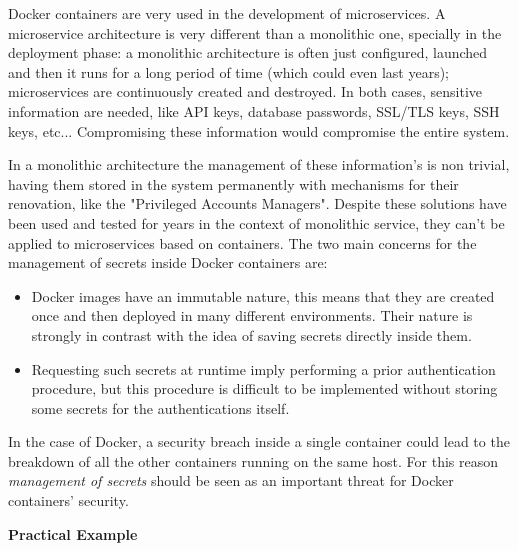 \documentclass[a4paper,12pt]{article}
\begin{document}
Docker containers are very used in the development of microservices. A
microservice architecture is very different than a monolithic one, specially in
the deployment phase: a monolithic architecture is often just configured,
launched and then it runs for a long period of time (which could even last
years); microservices are continuously created and destroyed. In both cases,
sensitive information are needed, like API keys, database passwords, SSL/TLS
keys, SSH keys, etc... Compromising these information would compromise the
entire system. \par In a monolithic architecture the management of these
information's is non trivial, having them stored in the system permanently with
mechanisms for their renovation, like the "Privileged Accounts
Managers"\cite{privileged_accounts_managers}. Despite these solutions have been
used and tested for years in the context of monolithic service, they can't be
applied to microservices based on containers. The two main concerns for the
management of secrets inside Docker containers
are\cite{secret_management_concerns_docker}:
\begin{itemize}
  \item Docker images have an immutable nature, this means that they are created
  once and then deployed in many different environments. Their nature is
  strongly in contrast with the idea of saving secrets directly inside them.  
  \item Requesting such secrets at runtime imply performing a prior
  authentication procedure, but this procedure is difficult to be implemented
  without storing some secrets for the authentications itself.
\end{itemize}
\par In the case of Docker, a security breach inside a single container could
lead to the breakdown of all the other containers running on the same host. For
this reason \textit{management of secrets} should be seen as an important threat
for Docker containers' security.

\bigbreak\textbf{Practical Example}\bigbreak 
\end{document}
